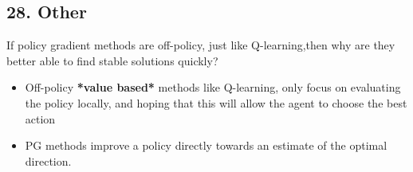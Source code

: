 \documentclass[letterpaper,10pt]{article}
\begin{document}
\begin{multicols}{2}
\section*{28. Other}
If policy gradient methods are off-policy, just like Q-learning,then why are they better able to find stable solutions quickly?

\begin{itemize}
    \item Off-policy \textbf{*value based*} methods like Q-learning, only focus on evaluating the policy locally, and hoping that this will allow the agent to choose the best action
    \item PG methods improve a policy directly towards an estimate of the optimal direction.
\end{itemize}

\end{multicols}
\end{document}

